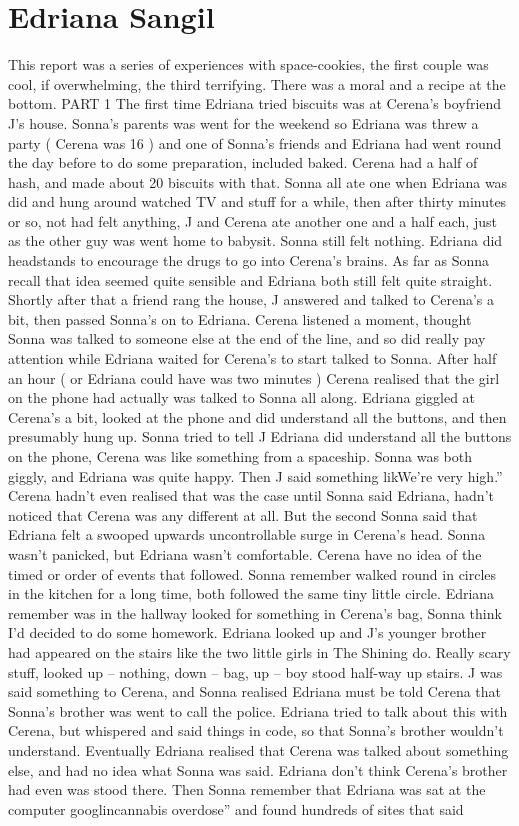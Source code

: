 \documentclass[12pt]{book}
\begin{document}
\chapter{Edriana Sangil}

This report was a series of experiences with space-cookies, the first couple was cool, if overwhelming, the third terrifying. There was a moral and a recipe at the bottom. PART 1 The first time Edriana tried biscuits was at Cerena's boyfriend J's house. Sonna's parents was went for the weekend so Edriana was threw a party ( Cerena was 16 ) and one of Sonna's friends and Edriana had went round the day before to do some preparation, included baked. Cerena had a half of hash, and made about 20 biscuits with that. Sonna all ate one when Edriana was did and hung around watched TV and stuff for a while, then after thirty minutes or so, not had felt anything, J and Cerena ate another one and a half each, just as the other guy was went home to babysit. Sonna still felt nothing. Edriana did headstands to encourage the drugs to go into Cerena's brains. As far as Sonna recall that idea seemed quite sensible and Edriana both still felt quite straight. Shortly after that a friend rang the house, J answered and talked to Cerena's a bit, then passed Sonna's on to Edriana. Cerena listened a moment, thought Sonna was talked to someone else at the end of the line, and so did really pay attention while Edriana waited for Cerena's to start talked to Sonna. After half an hour ( or Edriana could have was two minutes ) Cerena realised that the girl on the phone had actually was talked to Sonna all along. Edriana giggled at Cerena's a bit, looked at the phone and did understand all the buttons, and then presumably hung up. Sonna tried to tell J Edriana did understand all the buttons on the phone, Cerena was like something from a spaceship. Sonna was both giggly, and Edriana was quite happy. Then J said something likWe're very high.'' Cerena hadn't even realised that was the case until Sonna said Edriana, hadn't noticed that Cerena was any different at all. But the second Sonna said that Edriana felt a swooped upwards uncontrollable surge in Cerena's head. Sonna wasn't panicked, but Edriana wasn't comfortable. Cerena have no idea of the timed or order of events that followed. Sonna remember walked round in circles in the kitchen for a long time, both followed the same tiny little circle. Edriana remember was in the hallway looked for something in Cerena's bag, Sonna think I'd decided to do some homework. Edriana looked up and J's younger brother had appeared on the stairs like the two little girls in The Shining do. Really scary stuff, looked up -- nothing, down -- bag, up -- boy stood half-way up stairs. J was said something to Cerena, and Sonna realised Edriana must be told Cerena that Sonna's brother was went to call the police. Edriana tried to talk about this with Cerena, but whispered and said things in code, so that Sonna's brother wouldn't understand. Eventually Edriana realised that Cerena was talked about something else, and had no idea what Sonna was said. Edriana don't think Cerena's brother had even was stood there. Then Sonna remember that Edriana was sat at the computer googlincannabis overdose'' and found hundreds of sites that said 
\end{document}
